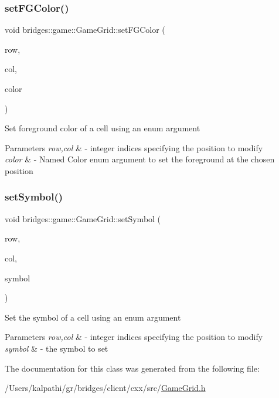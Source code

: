 \subsubsection{\texorpdfstring{set\+F\+G\+Color()}{setFGColor()}}
{\footnotesize\ttfamily void bridges\+::game\+::\+Game\+Grid\+::set\+F\+G\+Color (\begin{DoxyParamCaption}\item[{int}]{row,  }\item[{int}]{col,  }\item[{\mbox{\hyperlink{namespacebridges_1_1game_afaa832a4322b25b6a4ebfba832f10f26}{Named\+Color}}}]{color }\end{DoxyParamCaption})\hspace{0.3cm}{\ttfamily [inline]}}

Set foreground color of a cell using an enum argument


\begin{DoxyParams}{Parameters}
{\em row,col} & -\/ integer indices specifying the position to modify \\
\hline
{\em color} & -\/ Named Color enum argument to set the foreground at the chosen position \\
\hline
\end{DoxyParams}
\mbox{\label{classbridges_1_1game_1_1_game_grid_aaca03d00599251edb5312e9ba51dd62e}} 
\subsubsection{\texorpdfstring{set\+Symbol()}{setSymbol()}}
{\footnotesize\ttfamily void bridges\+::game\+::\+Game\+Grid\+::set\+Symbol (\begin{DoxyParamCaption}\item[{int}]{row,  }\item[{int}]{col,  }\item[{\mbox{\hyperlink{namespacebridges_1_1game_ab9a19c7ab6e2ebac2f95180e21733487}{Named\+Symbol}}}]{symbol }\end{DoxyParamCaption})\hspace{0.3cm}{\ttfamily [inline]}}

Set the symbol of a cell using an enum argument


\begin{DoxyParams}{Parameters}
{\em row,col} & -\/ integer indices specifying the position to modify \\
\hline
{\em symbol} & -\/ the symbol to set \\
\hline
\end{DoxyParams}


The documentation for this class was generated from the following file\+:\begin{DoxyCompactItemize}
\item 
/\+Users/kalpathi/gr/bridges/client/cxx/src/\mbox{\hyperlink{_game_grid_8h}{Game\+Grid.\+h}}\end{DoxyCompactItemize}
